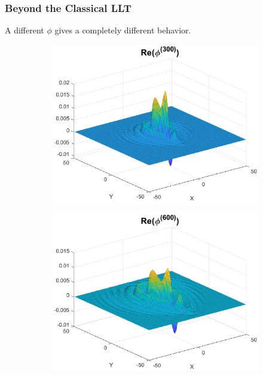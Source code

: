 \documentclass{beamer}
\theoremstyle{definition}
\begin{document}
\begin{frame}
\frametitle{Beyond the Classical LLT}

A different $\phi$ gives a completely different behavior.

\begin{figure}
\begin{subfigure}{0.495\textwidth}
	\centering
	\includegraphics[width=\textwidth]{conv_ex0.eps}
\end{subfigure}
\begin{subfigure}{0.495\textwidth}
	\centering
	\includegraphics[width=\textwidth]{conv_ex1.eps}
\end{subfigure}
\end{figure}
\end{frame}
\end{document}
